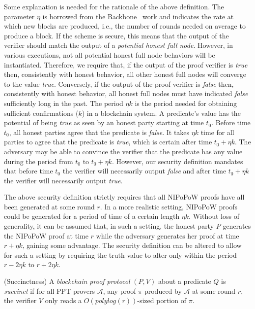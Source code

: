 Some explanation is needed for the rationale of the above definition. The
parameter $\eta$ is borrowed from the Backbone~\cite{backbone} work and
indicates the rate at which new blocks are produced, i.e., the number of rounds
needed on average to produce a block. If the scheme is secure, this means that
the output of the verifier should match the output of a \emph{potential honest
full node}. However, in various executions, not all potential honest full node
behaviors will be instantiated. Therefore, we require that, if the output of the
proof verifier is \emph{true} then, consistently with honest behavior, all other
honest full nodes will converge to the value \emph{true}. Conversely, if the
output of the proof verifier is \emph{false} then, consistently with honest
behavior, all honest full nodes must have indicated \emph{false} sufficiently
long in the past. The period $\eta k$ is the period needed for obtaining
sufficient confirmations ($k$) in a blockchain system. A predicate's value has
the potential of being \emph{true} as seen by an honest party starting at time
$t_0$. Before time $t_0$, all honest parties agree that the predicate is
\emph{false}. It takes $\eta k$ time for all parties to agree that the predicate
is \emph{true}, which is certain after time $t_0 + \eta k$. The adversary may be
able to convince the verifier that the predicate has any value during the period
from $t_0$ to $t_0 + \eta k$. However, our security definition mandates that
before time $t_0$ the verifier will necessarily output \emph{false} and after
time $t_0 + \eta k$ the verifier will necessarily output \emph{true}.

\begin{remark}
  The above security definition strictly requires that all NIPoPoW proofs have
  all been generated at some round $r$. In a more realistic setting,
  NIPoPoW proofs could be generated for a period of time of a certain length
  $\eta k$. Without loss of generality, it can be assumed that, in such a
  setting, the honest party $P$ generates the NIPoPoW proof at time $r$ while
  the adversary generates her proof at time $r + \eta k$, gaining some
  advantage. The security definition can be altered to allow for such a setting
  by requiring the truth value to alter only within the period $r - 2\eta k$ to
  $r + 2\eta k$.
\end{remark}

\begin{definition}{(Succinctness)}
A \emph{blockchain proof protocol} $(P, V)$ about a predicate $Q$ is
\emph{succinct} if for all PPT provers $\mathcal{A}$, any proof $\pi$ produced
by $\mathcal{A}$ at some round $r$, the verifier $V$ only reads a
$O(polylog(r))$-sized portion of $\pi$.
\end{definition}

